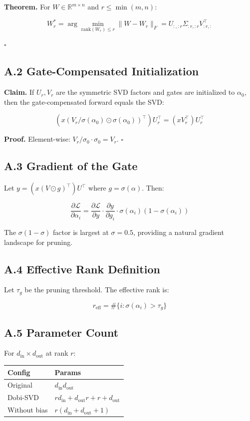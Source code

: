 \textbf{Theorem.} For $W \in \mathbb{R}^{m \times n}$ and $r \leq \min(m, n)$:

\[
W_r^* = \arg\min_{\text{rank}(W_r) \leq r} \|W - W_r\|_F = U_{:, :r} \Sigma_{:r, :r} V_{:r, :}^\top
\tag{A.1}
\]

$\square$

\subsection{A.2 Gate-Compensated Initialization}

\textbf{Claim.} If $U_r, V_r$ are the symmetric SVD factors and gates are 
initialized to $\alpha_0$, then the gate-compensated forward equals the SVD:

\[
(x (V_r / \sigma(\alpha_0) \odot \sigma(\alpha_0))^\top) U_r^\top = (x V_r^\top) U_r^\top
\tag{A.2}
\]

\textbf{Proof.} Element-wise: $V_r / \sigma_0 \cdot \sigma_0 = V_r$. $\square$

\subsection{A.3 Gradient of the Gate}

Let $y = (x (V \odot g)^\top) U^\top$ where $g = \sigma(\alpha)$. Then:

\[
\frac{\partial \mathcal{L}}{\partial \alpha_i}
= \frac{\partial \mathcal{L}}{\partial y} \cdot \frac{\partial y}{\partial g_i} \cdot \sigma(\alpha_i)(1 - \sigma(\alpha_i))
\tag{A.3}
\]

The $\sigma(1-\sigma)$ factor is largest at $\sigma = 0.5$, providing a 
natural gradient landscape for pruning.

\subsection{A.4 Effective Rank Definition}

Let $\tau_g$ be the pruning threshold. The effective rank is:

\[
r_\text{eff} = \#\{i : \sigma(\alpha_i) > \tau_g\}
\tag{A.4}
\]

\subsection{A.5 Parameter Count}

For $d_\text{in} \times d_\text{out}$ at rank $r$:

\begin{table}[H]
\centering
\small
\begin{tabular}{ll}
\toprule
\textbf{Config} & \textbf{Params} \\
\midrule
Original & $d_\text{in} d_\text{out}$ \\
Dobi-SVD & $r d_\text{in} + d_\text{out} r + r + d_\text{out}$ \\
Without bias & $r(d_\text{in} + d_\text{out} + 1)$ \\
\bottomrule
\end{tabular}
\end{table}

